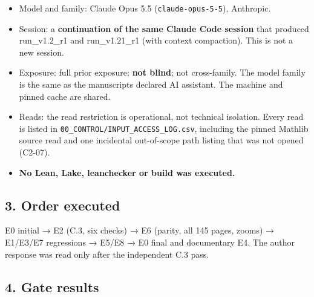 \documentclass[
]{article}
\providecommand{\tightlist}{%
  \setlength{\itemsep}{0pt}\setlength{\parskip}{0pt}}
\begin{document}
\begin{itemize}
\tightlist
\item
  Model and family: Claude Opus 5.5 (\texttt{claude-opus-5-5}),
  Anthropic.
\item
  Session: a \textbf{continuation of the same Claude Code session} that
  produced run\_v1.2\_r1 and run\_v1.21\_r1 (with context compaction).
  This is not a new session.
\item
  Exposure: full prior exposure; \textbf{not blind}; not cross-family.
  The model family is the same as the manuscript\textquotesingle s
  declared AI assistant. The machine and pinned cache are shared.
\item
  Reads: the read restriction is operational, not technical isolation.
  Every read is listed in \texttt{00\_CONTROL/INPUT\_ACCESS\_LOG.csv},
  including the pinned Mathlib source read and one incidental
  out-of-scope path listing that was not opened (C2-07).
\item
  \textbf{No Lean, Lake, leanchecker or build was executed.}
\end{itemize}

\subsection{3. Order executed}\label{3-order-executed}

E0 initial → E2 (C.3, six checks) → E6 (parity, all 145 pages, zooms) →
E1/E3/E7 regressions → E5/E8 → E0 final and documentary E4. The author
response was read only after the independent C.3 pass.

\subsection{4. Gate results}\label{4-gate-results}
\end{document}
